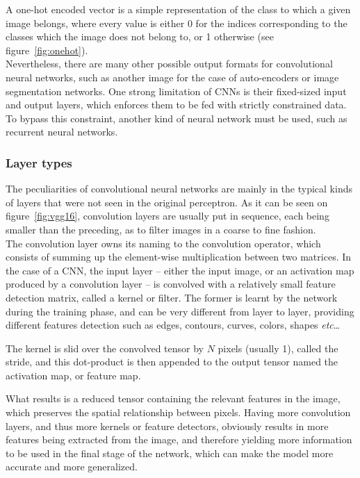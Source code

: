 A one-hot encoded vector is a simple representation of the class to which a
given image belongs, where every value is either 0 for the indices
corresponding to the classes which the image does not belong to, or 1 otherwise
(see figure~\ref{fig:onehot}).\\

Nevertheless, there are many other possible output formats for convolutional
neural networks, such as another image for the case of auto-encoders or image
segmentation networks. One strong limitation of CNNs is their fixed-sized
input and output layers, which enforces them to be fed with strictly
constrained data. To bypass this constraint, another kind of neural network
must be used, such as recurrent neural networks.

	\subsubsection{Layer types}

The peculiarities of convolutional neural networks are mainly in the typical
kinds of layers that were not seen in the original perceptron. As it can be seen
on figure~\ref{fig:vgg16}, convolution layers are usually put in sequence, each
being smaller than the preceding, as to filter images in a coarse to fine
fashion.\\

The convolution layer owns its naming to the convolution operator, which
consists of summing up the element-wise multiplication between two matrices. In
the case of a CNN, the input layer -- either the input image, or an activation
map produced by a convolution layer -- is convolved with a relatively small
feature detection matrix, called a kernel or filter. The former is learnt by the
network during the training phase, and can be very different from layer to
layer, providing different features detection such as edges, contours, curves,
colors, shapes \emph{etc}\ldots

The kernel is slid over the convolved tensor by $N$ pixels (usually 1), called
the stride, and this dot-product is then appended to the output tensor named
the activation map, or feature map.

What results is a reduced tensor containing the relevant features in the image,
which preserves the spatial relationship between pixels. Having more convolution
layers, and thus more kernels or feature detectors, obviously results in more
features being extracted from the image, and therefore yielding more information
to be used in the final stage of the network, which can make the model more
accurate and more generalized.

